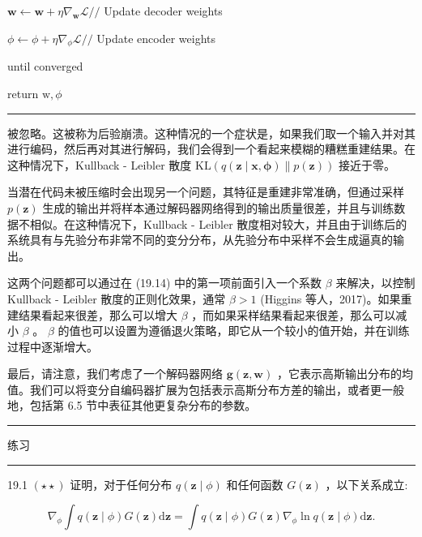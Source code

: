 \documentclass[10pt]{report}
\newcommand{\HRule}{\begin{center}\rule{0.9\linewidth}{0.2mm}\end{center}}
\begin{document}
\hspace*{1em} \(\mathbf{w} \leftarrow  \mathbf{w} + \eta {\nabla }_{\mathbf{w}}\mathcal{L}//\) Update decoder weights

\hspace*{1em} \(\phi  \leftarrow  \phi  + \eta {\nabla }_{\phi }\mathcal{L}//\) Update encoder weights

until converged

return \(\mathrm{w},\phi\)

\HRule

被忽略。这被称为后验崩溃。这种情况的一个症状是，如果我们取一个输入并对其进行编码，然后再对其进行解码，我们会得到一个看起来模糊的糟糕重建结果。在这种情况下，Kullback - Leibler 散度 \(\mathrm{{KL}}\left( {q\left( {\mathbf{z} \mid  \mathbf{x},\mathbf{\phi }}\right) \parallel p\left( \mathbf{z}\right) }\right)\) 接近于零。

当潜在代码未被压缩时会出现另一个问题，其特征是重建非常准确，但通过采样 \(p\left( \mathbf{z}\right)\) 生成的输出并将样本通过解码器网络得到的输出质量很差，并且与训练数据不相似。在这种情况下，Kullback - Leibler 散度相对较大，并且由于训练后的系统具有与先验分布非常不同的变分分布，从先验分布中采样不会生成逼真的输出。

这两个问题都可以通过在 (19.14) 中的第一项前面引入一个系数 \(\beta\) 来解决，以控制 Kullback - Leibler 散度的正则化效果，通常 \(\beta  > 1\) (Higgins 等人，2017)。如果重建结果看起来很差，那么可以增大 \(\beta\) ，而如果采样结果看起来很差，那么可以减小 \(\beta\) 。 \(\beta\) 的值也可以设置为遵循退火策略，即它从一个较小的值开始，并在训练过程中逐渐增大。

最后，请注意，我们考虑了一个解码器网络 \(\mathbf{g}\left( {\mathbf{z},\mathbf{w}}\right)\) ，它表示高斯输出分布的均值。我们可以将变分自编码器扩展为包括表示高斯分布方差的输出，或者更一般地，包括第 6.5 节中表征其他更复杂分布的参数。

\HRule

练习

\HRule

19.1 \(\left( {\star  \star  }\right)\) 证明，对于任何分布 \(q\left( {\mathbf{z} \mid  \phi }\right)\) 和任何函数 \(G\left( \mathbf{z}\right)\) ，以下关系成立:

\[
{\nabla }_{\phi }\int q\left( {\mathbf{z} \mid  \phi }\right) G\left( \mathbf{z}\right) \mathrm{d}\mathbf{z} = \int q\left( {\mathbf{z} \mid  \phi }\right) G\left( \mathbf{z}\right) {\nabla }_{\phi }\ln q\left( {\mathbf{z} \mid  \phi }\right) \mathrm{d}\mathbf{z}. \tag{19.20}
\]
\end{document}
